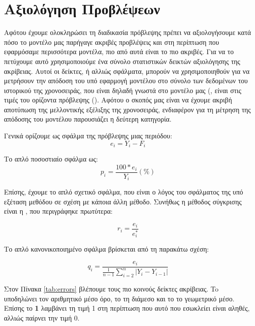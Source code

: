 \section{Αξιολόγηση Προβλέψεων}

Αφότου έχουμε ολοκληρώσει τη διαδικασία πρόβλεψης πρέπει να αξιολογήσουμε κατά πόσο το μοντέλο μας παρήγαγε ακριβές προβλέψεις και στη περίπτωση που εφαρμόσαμε περισσότερα μοντέλα, πιο από αυτά είναι το πιο ακριβές. Για να το πετύχουμε αυτό χρησιμοποιούμε ένα σύνολο στατιστικών δεικτών αξιολόγησης της ακρίβειας. Αυτοί οι δείκτες, ή αλλιώς σφάλματα, μπορούν να χρησιμοποιηθούν για να μετρήσουν την απόδοση του υπό εφαρμογή μοντέλου στο σύνολο των δεδομένων του ιστορικού της χρονοσειράς, που είναι δηλαδή γνωστά στο μοντέλο μας (, είναι στις τιμές του ορίζοντα πρόβλεψης (). Αφότου ο σκοπός μας είναι να έχουμε ακριβή αποτύπωση της μελλοντικής εξέλιξης της χρονοσειράς, ενδιαφέρον για τη μέτρηση της απόδοσης του μοντέλου παρουσιάζει η δεύτερη κατηγορία. 

Γενικά ορίζουμε ως σφάλμα της πρόβλεψης μιας περιόδου:
\[e_i = Y_i - F_i\]

Το απλό ποσοστιαίο σφάλμα ως:
\[p_i = \frac{ 100 * e_i} { Y_i } (\%) \]

Επίσης, έχουμε το απλό σχετικό σφάλμα, που είναι ο λόγος του σφάλματος της υπό εξέταση μεθόδου σε σχέση με κάποια άλλη μέθοδο. Συνήθως η μέθοδος σύγκρισης είναι η , που περιγράφηκε πρωτύτερα:

\[r_i = \frac{  e_i} { e_i^* } \]

Το απλό κανονικοποιημένο σφάλμα βρίσκεται από τη παρακάτω σχέση:

\[q_i = \frac{  e_i} { \frac{1}{n-1} \sum_{i=2}^n {|Y_i - Y_{i-1}|}} \]


Στον Πίνακα \ref{tab:errors} βλέπουμε τους πιο κοινούς δείκτες ακρίβειας. To  υποδηλώνει τον αριθμητικό μέσο όρο, το  τη διάμεσο και το  το γεωμετρικό μέσο. Επίσης το \textbf{1} λαμβάνει τη τιμή 1 στη περίπτωση που αυτό που εσωκλείει είναι αληθές, αλλιώς παίρνει την τιμή 0.

